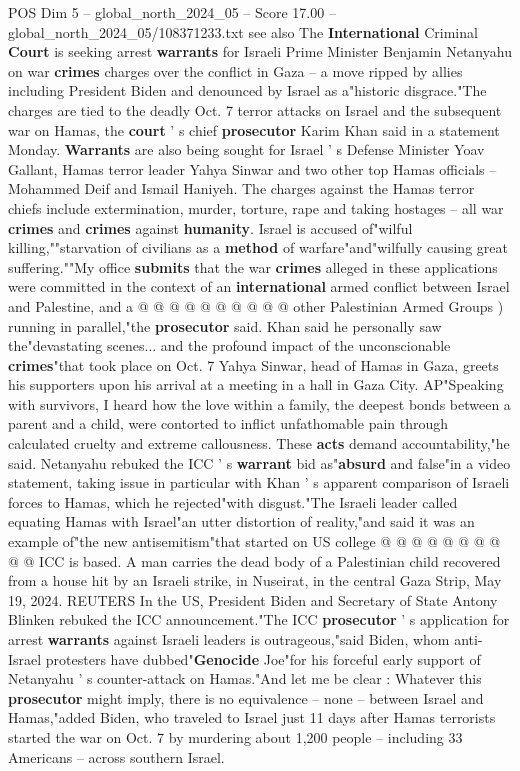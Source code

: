\begin{textsample}{POS Dim 5 – global\_north\_2024\_05 – Score 17.00 – global\_north\_2024\_05/108371233.txt}  \label{ex:f5_pos_176}
see also The \textbf{International} Criminal \textbf{Court} is seeking arrest \textbf{warrants} for Israeli Prime Minister Benjamin Netanyahu on war \textbf{crimes} charges over the conflict in Gaza -- a move ripped by allies including President Biden and denounced by Israel as a"historic disgrace."The charges are tied to the deadly Oct. 7 terror attacks on Israel and the subsequent war on Hamas, the \textbf{court} ' s chief \textbf{prosecutor} Karim Khan said in a statement Monday. \textbf{Warrants} are also being sought for Israel ' s Defense Minister Yoav Gallant, Hamas terror leader Yahya Sinwar and two other top Hamas officials -- Mohammed Deif and Ismail Haniyeh.
The charges against the Hamas terror chiefs include extermination, murder, torture, rape and taking hostages -- all war \textbf{crimes} and \textbf{crimes} against \textbf{humanity}.
Israel is accused of"wilful killing,""starvation of civilians as a \textbf{method} of warfare"and"wilfully causing great suffering.""My office \textbf{submits} that the war \textbf{crimes} alleged in these applications were committed in the context of an \textbf{international} armed conflict between Israel and Palestine, and a @ @ @ @ @ @ @ @ @ @ other Palestinian Armed Groups ) running in parallel,"the \textbf{prosecutor} said.
Khan said he personally saw the"devastating scenes... and the profound impact of the unconscionable \textbf{crimes}"that took place on Oct. 7 Yahya Sinwar, head of Hamas in Gaza, greets his supporters upon his arrival at a meeting in a hall in Gaza City.
AP"Speaking with survivors, I heard how the love within a family, the deepest bonds between a parent and a child, were contorted to inflict unfathomable pain through calculated cruelty and extreme callousness.
These \textbf{acts} demand accountability,"he said.
Netanyahu rebuked the ICC ' s \textbf{warrant} bid as"\textbf{absurd} and false"in a video statement, taking issue in particular with Khan ' s apparent comparison of Israeli forces to Hamas, which he rejected"with disgust."The Israeli leader called equating Hamas with Israel"an utter distortion of reality,"and said it was an example of"the new antisemitism"that started on US college @ @ @ @ @ @ @ @ @ @ ICC is based.
A man carries the dead body of a Palestinian child recovered from a house hit by an Israeli strike, in Nuseirat, in the central Gaza Strip, May 19, 2024.
REUTERS In the US, President Biden and Secretary of State Antony Blinken rebuked the ICC announcement."The ICC \textbf{prosecutor} ' s application for arrest \textbf{warrants} against Israeli leaders is outrageous,"said Biden, whom anti-Israel protesters have dubbed"\textbf{Genocide} Joe"for his forceful early support of Netanyahu ' s counter-attack on Hamas."And let me be clear : Whatever this \textbf{prosecutor} might imply, there is no equivalence -- none -- between Israel and Hamas,"added Biden, who traveled to Israel just 11 days after Hamas terrorists started the war on Oct. 7 by murdering about 1,200 people -- including 33 Americans -- across southern Israel.

\end{textsample}
